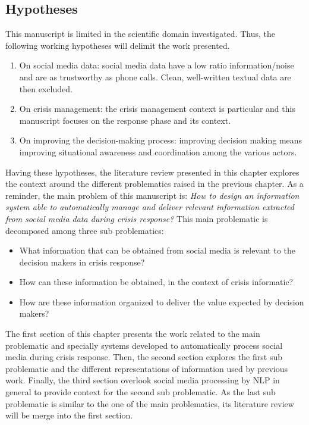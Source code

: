 \subsection*{Hypotheses}
This manuscript is limited in the scientific domain investigated.
Thus, the following working hypotheses will delimit the work presented.

\begin{enumerate}
    \item On social media data: social media data have a low ratio information/noise and are as trustworthy as phone calls.
          Clean, well-written textual data are then excluded.
    \item On crisis management: the crisis management context is particular and this manuscript focuses on the response phase and its context.
    \item On improving the decision-making process: improving decision making means improving situational awareness and coordination among the various actors.
\end{enumerate}

Having these hypotheses, the literature review presented in this chapter explores the context around the different problematics raised in the previous chapter.
As a reminder, the main problem of this manuscript is: \emph{How to design an information system able to automatically manage and deliver relevant information extracted from social media data during crisis response?}
This main problematic is decomposed among three sub problematics:

\begin{itemize}
    \item What information that can be obtained from social media is relevant to the decision makers in crisis response?
    \item How can these information be obtained, in the context of crisis informatic?
    \item How are these information organized to deliver the value expected by decision makers?
\end{itemize}

The first section of this chapter presents the work related to the main problematic and specially systems developed to automatically process social media during crisis response.
Then, the second section explores the first sub problematic and the different representations of information used by previous work.
Finally, the third section overlook social media processing by NLP in general to provide context for the second sub problematic.
As the last sub problematic is similar to the one of the main problematics, its literature review will be merge into the first section.

